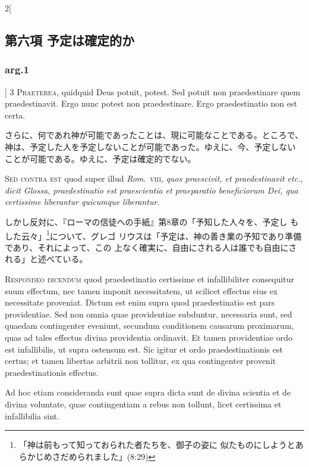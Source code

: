 \documentclass[paper=a4paper,fontsize=10pt,jafontsize=9pt,titlepage]{jlreq}
\begin{document}
\begin{paracol}{2}[\subsection{第六項 予定は確定的か}\subsubsection{arg.1}]
{\scshape 3 Praeterea}, quidquid Deus potuit,
potest. Sed potuit non praedestinare quem praedestinavit. Ergo nunc
potest non praedestinare. Ergo praedestinatio non est certa.


\switchcolumn


さらに、何であれ神が可能であったことは、現に可能なことである。ところで、
神は、予定した人を予定しないことが可能であった。ゆえに、今、予定しない
ことが可能である。ゆえに、予定は確定的でない。


\switchcolumn*[\subsubsection{s.c.}]


{\scshape Sed contra est} quod super illud {\itshape Rom}.~{\scshape viii},
{\itshape quos praescivit, et praedestinavit etc., dicit Glossa, praedestinatio
est praescientia et praeparatio beneficiorum Dei, qua certissime
liberantur quicumque liberantur.}


\switchcolumn


しかし反対に、『ローマの信徒への手紙』第8章の「予知した人々を、予定し
もした云々」\footnote{「神は前もって知っておられた者たちを、御子の姿に
似たものにしようとあらかじめさだめられました」(8:29)}について、グレゴ
リウスは「予定は、神の善き業の予知であり準備であり、それによって、この
上なく確実に、自由にされる人は誰でも自由にされる」と述べている。




{\scshape Respondeo dicendum} quod praedestinatio
certissime et infallibiliter consequitur suum effectum, nec tamen
imponit necessitatem, ut scilicet effectus eius ex necessitate
proveniat. Dictum est enim supra quod praedestinatio est pars
providentiae. Sed non omnia quae providentiae subduntur, necessaria
sunt, sed quaedam contingenter eveniunt, secundum conditionem causarum
proximarum, quas ad tales effectus divina providentia ordinavit. Et
tamen providentiae ordo est infallibilis, ut supra ostensum est. Sic
igitur et ordo praedestinationis est certus; et tamen libertas arbitrii
non tollitur, ex qua contingenter provenit praedestinationis
effectus. 

\hspace{2em}Ad hoc etiam consideranda sunt quae supra dicta sunt de divina
scientia et de divina voluntate, quae contingentiam a rebus non tollunt,
licet certissima et infallibilia sint.



\end{paracol}
\end{document}
